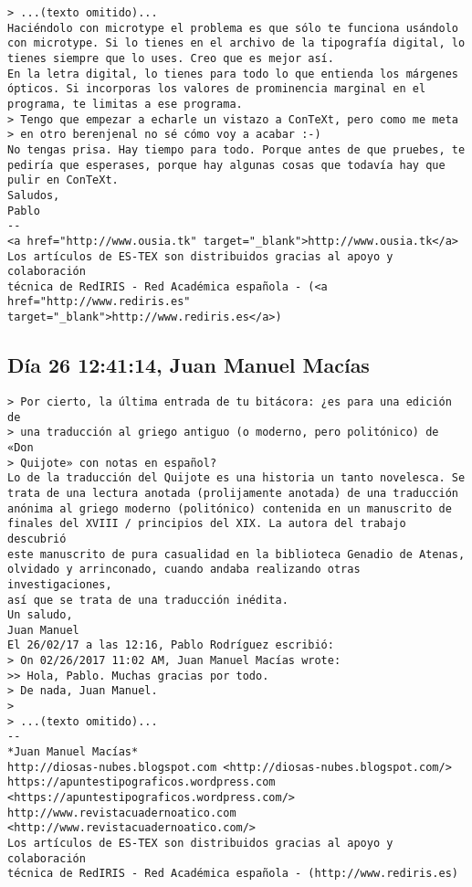 \documentclass[a4paper,10pt]{article}
\begin{document}
\begin{lstlisting}
> ...(texto omitido)...
Haciéndolo con microtype el problema es que sólo te funciona usándolo
con microtype. Si lo tienes en el archivo de la tipografía digital, lo
tienes siempre que lo uses. Creo que es mejor así.
En la letra digital, lo tienes para todo lo que entienda los márgenes
ópticos. Si incorporas los valores de prominencia marginal en el
programa, te limitas a ese programa.
> Tengo que empezar a echarle un vistazo a ConTeXt, pero como me meta
> en otro berenjenal no sé cómo voy a acabar :-)
No tengas prisa. Hay tiempo para todo. Porque antes de que pruebes, te
pediría que esperases, porque hay algunas cosas que todavía hay que
pulir en ConTeXt.
Saludos,
Pablo
-- 
<a href="http://www.ousia.tk" target="_blank">http://www.ousia.tk</a>
Los artículos de ES-TEX son distribuidos gracias al apoyo y colaboración 
técnica de RedIRIS - Red Académica española - (<a href="http://www.rediris.es" target="_blank">http://www.rediris.es</a>)

\end{lstlisting}

\subsection{Día 26 12:41:14, Juan Manuel Macías}

\begin{lstlisting}
> Por cierto, la última entrada de tu bitácora: ¿es para una edición de
> una traducción al griego antiguo (o moderno, pero politónico) de «Don
> Quijote» con notas en español?
Lo de la traducción del Quijote es una historia un tanto novelesca. Se 
trata de una lectura anotada (prolijamente anotada) de una traducción 
anónima al griego moderno (politónico) contenida en un manuscrito de 
finales del XVIII / principios del XIX. La autora del trabajo descubrió 
este manuscrito de pura casualidad en la biblioteca Genadio de Atenas, 
olvidado y arrinconado, cuando andaba realizando otras investigaciones, 
así que se trata de una traducción inédita.
Un saludo,
Juan Manuel
El 26/02/17 a las 12:16, Pablo Rodríguez escribió:
> On 02/26/2017 11:02 AM, Juan Manuel Macías wrote:
>> Hola, Pablo. Muchas gracias por todo.
> De nada, Juan Manuel.
>
> ...(texto omitido)...
-- 
*Juan Manuel Macías*
http://diosas-nubes.blogspot.com <http://diosas-nubes.blogspot.com/>
https://apuntestipograficos.wordpress.com 
<https://apuntestipograficos.wordpress.com/>
http://www.revistacuadernoatico.com <http://www.revistacuadernoatico.com/>
Los artículos de ES-TEX son distribuidos gracias al apoyo y colaboración 
técnica de RedIRIS - Red Académica española - (http://www.rediris.es)

\end{lstlisting}
\end{document}
